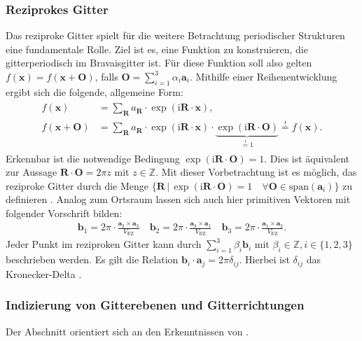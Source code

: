 \subsubsection{Reziprokes Gitter}
Das reziproke Gitter spielt für die weitere Betrachtung periodischer Strukturen eine fundamentale Rolle.
Ziel ist es, eine Funktion zu konstruieren, die gitterperiodisch im Bravaisgitter ist.
Für diese Funktion soll also gelten
$f(\mathbf{x})=f(\mathbf{x}+\mathbf{O})$, falls $\mathbf{O}=\sum_{i=1}^{3} \alpha_{i}\mathbf{a}_{i}$.
Mithilfe einer Reihenentwicklung ergibt sich die folgende, allgemeine Form:
\begin{align}
    \begin{split}
        f(\mathbf{x})&=\sum_{\mathbf{R}}a_{\mathbf{R}}\cdot \exp(\mathrm{i}\mathbf{R}\cdot\mathbf{x}),\\
        f(\mathbf{x}+\mathbf{O})&=\sum_{\mathbf{R}}a_{\mathbf{R}}\cdot \exp(\mathrm{i}\mathbf{R}\cdot \mathbf{x})\cdot
        \underbrace{ \exp(\mathrm{i}\mathbf{R}\cdot \mathbf{O}) }_{ \stackrel{!}{=}1 }  \stackrel{!}{=} f(\mathbf{x}).
    \end{split}
\end{align}
Erkennbar ist die notwendige Bedingung $\exp(\mathrm{i}\mathbf{R}\cdot \mathbf{O})=1$.
Dies ist äquivalent zur Aussage $\mathbf{R}\cdot \mathbf{O}=2\pi z$ mit $z \in \mathbb{Z}$.
Mit dieser Vorbetrachtung ist es möglich, das reziproke Gitter durch die Menge
$\{ \mathbf{R} \,\vert\, \exp(\mathrm{i}\mathbf{R}\cdot \mathbf{O})=1 \quad
\forall \mathbf{O} \in \text{span}(\mathbf{a}_{i}) \}$ zu definieren \autocite{Ashcroft}.
Analog zum Ortsraum lassen sich auch hier primitiven Vektoren mit folgender Vorschrift bilden:
\begin{align*}
    \mathbf{b}_{1} = 2\pi \cdot \frac{\mathbf{a}_{2} \times \mathbf{a}_{3}}{V_{\mathrm{EZ}}} \quad
    \mathbf{b}_{2} = 2\pi \cdot \frac{\mathbf{a}_{3} \times \mathbf{a}_{1}}{V_{\mathrm{EZ}}} \quad
    \mathbf{b}_{3} = 2\pi \cdot \frac{\mathbf{a}_{1} \times \mathbf{a}_{2}}{V_{\mathrm{EZ}}}.
\end{align*}
Jeder Punkt im reziproken Gitter kann durch $\sum_{i=1}^{3} \beta_{i}\mathbf{b}_{i}$ mit $\beta_i \in \mathbb{Z},
i\in\{1,2,3\}$ beschrieben werden.
Es gilt die Relation $\mathbf{b}_{i}\cdot \mathbf{a}_{j}=2 \pi \delta_{ij}$.
Hierbei ist $\delta_{ij}$ das Kronecker-Delta \autocite{Ashcroft}.

\subsubsection{Indizierung von Gitterebenen und Gitterrichtungen}\label{subsubsec:indizierung}
Der Abschnitt orientiert sich an den Erkenntnissen von  \autocite{Ashcroft}.

